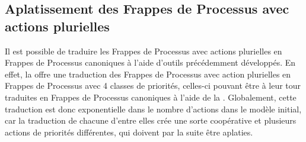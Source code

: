 \subsection{Aplatissement des Frappes de Processus avec actions plurielles}

Il est possible de traduire les Frappes de Processus avec actions plurielles
en Frappes de Processus canoniques à l'aide d'outils précédemment développés.
En effet, la  offre une traduction des Frappes de Processus avec action plurielles
en Frappes de Processus avec 4 classes de priorités, celles-ci pouvant être à leur tour traduites
en Frappes de Processus canoniques à l'aide de la .
Globalement, cette traduction est donc exponentielle dans le nombre d'actions dans le modèle
initial, car la traduction de chacune d'entre elles crée une sorte coopérative et plusieurs
actions de priorités différentes, qui doivent par la suite être aplaties.
